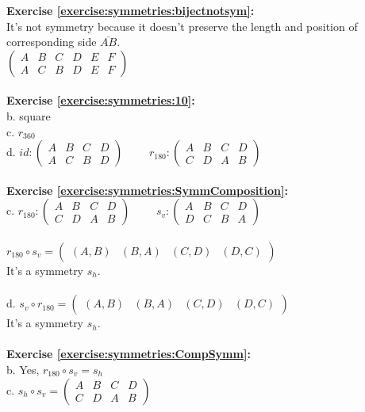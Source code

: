 \textbf{Exercise \ref{exercise:symmetries:bijectnotsym}:}\\
It's not symmetry because it doesn't preserve the length and position of corresponding side $\overline{AB}$.\\
$\begin{pmatrix}
A & B & C & D & E & F\\
A & C & B & D & E & F
\end{pmatrix}$\\
\\
\textbf{Exercise \ref{exercise:symmetries:10}:}\\
b. square\\
c. $r_{360}$\\
d. $id: \begin{pmatrix}
A & B & C & D\\
A & C & B & D
\end{pmatrix}$
$\qquad r_{180}: \begin{pmatrix}
A & B & C & D\\
C & D & A & B
\end{pmatrix}$\\
\\
\textbf{Exercise \ref{exercise:symmetries:SymmComposition}:}\\
c. $r_{180}: \begin{pmatrix}
A & B & C & D\\
C & D & A & B
\end{pmatrix}$
$\qquad s_v: \begin{pmatrix}
A & B & C & D\\
D & C & B & A
\end{pmatrix}$\\
\\
$r_{180}\circ s_v=\begin{pmatrix}
(A,B) & (B,A) & (C,D) & (D,C)
\end{pmatrix}$\\
It's a symmetry $s_h$.\\
\\
d. $s_v\circ r_{180}=\begin{pmatrix}
(A,B) & (B,A) & (C,D) & (D,C)
\end{pmatrix}$\\
It's a symmetry $s_h$.\\
\\
\textbf{Exercise \ref{exercise:symmetries:CompSymm}:}\\
b. Yes, $r_{180}\circ s_v=s_h$\\
c. $s_h\circ s_v=\begin{pmatrix}
A & B & C & D\\
C & D & A & B
\end{pmatrix}$\\
